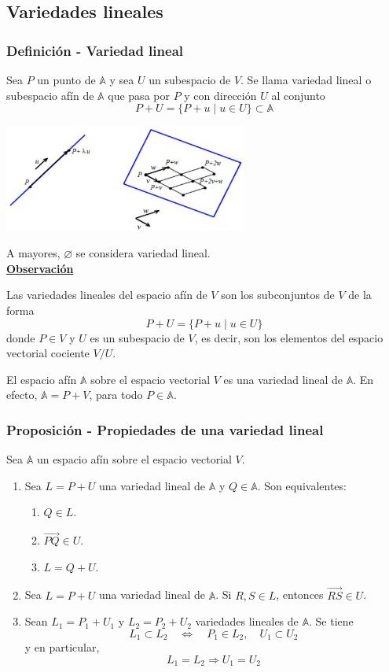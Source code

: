 \documentclass[12pt, a4paper, ones, notitlepage, openany,titlepage]{article}
\newcommand{\observacion}{\noindent\underline{\textbf{Observación}}}
\begin{document}
\subsection{Variedades lineales}

\subsubsection{Definición - Variedad lineal}
Sea $P$ un punto de $\mathbb{A}$ y sea $U$ un subespacio de $V$. Se llama variedad lineal o subespacio afín de $\mathbb{A}$ que pasa por $P$ y con dirección $U$ al conjunto
$$
P+U=\{P+u \mid u \in U\} \subset \mathbb{A}
$$
\begin{center}
\includegraphics[max width=8cm]{2023_03_01_7659aec5e35f9a9b2d3cg-03}
\end{center}
\noindent A mayores, $\varnothing$ se considera variedad lineal.\\

\observacion

\noindent Las variedades lineales del espacio afín de $V$ son los subconjuntos de $V$ de la forma
$$
P+U=\{P+u \mid u \in U\}
$$
donde $P \in V$ y $U$ es un subespacio de $V$, es decir, son los elementos del espacio vectorial cociente $V / U$.

El espacio afín $\mathbb{A}$ sobre el espacio vectorial $V$ es una variedad lineal de $\mathbb{A}$. En efecto, $\mathbb{A}=P+V$, para todo $P \in \mathbb{A}$.

\subsubsection{Proposición - Propiedades de una variedad lineal}
\noindent Sea $\mathbb{A}$ un espacio afín sobre el espacio vectorial $V$.
\begin{enumerate}[label=(\arabic*)]
\item Sea $L=P+U$ una variedad lineal de $\mathbb{A}$ y $Q \in \mathbb{A}$. Son equivalentes:
\begin{enumerate}[label=(\alph*)]
\item $Q \in L$.
\item $\overrightarrow{P Q} \in U$.
\item $L=Q+U$.
\end{enumerate}
\item Sea $L=P+U$ una variedad lineal de $\mathbb{A}$. Si $R, S \in L$, entonces $\overrightarrow{R S} \in U$.
\item Sean $L_{1}=P_{1}+U_{1}$ y $L_{2}=P_{2}+U_{2}$ variedades lineales de $\mathbb{A}$. Se tiene
$$
L_{1} \subset L_{2} \quad \Longleftrightarrow \quad P_{1} \in L_{2}, \quad U_{1} \subset U_{2}
$$
\noindent y en particular,
$$
L_{1}=L_{2} \Rightarrow U_{1}=U_{2}
$$
\end{enumerate}
\end{document}
